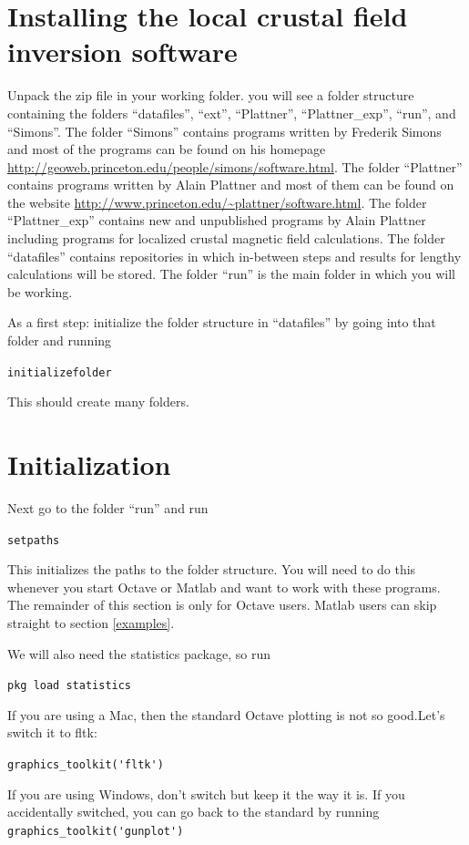 \documentclass[11pt]{article}
\begin{document}
\section{Installing the local crustal field inversion software}\label{installing}

Unpack the zip file in your working folder. you will see a folder structure containing the folders ``datafiles'', ``ext'', ``Plattner'', ``Plattner\_exp'', ``run'', and ``Simons''. The folder ``Simons'' contains programs written by Frederik Simons and most of the programs can be found on his homepage \url{http://geoweb.princeton.edu/people/simons/software.html}. The folder ``Plattner'' contains programs written by Alain Plattner and most of them can be found on the website \url{http://www.princeton.edu/~plattner/software.html}. The folder ``Plattner\_exp'' contains new and unpublished programs by Alain Plattner including programs for localized crustal magnetic field calculations. The folder ``datafiles'' contains repositories in which in-between steps and results for lengthy calculations will be stored. The folder ``run'' is the main folder in which you will be working.

As a first step: initialize the folder structure in ``datafiles'' by going into that folder and running

\qquad \verb+initializefolder+

This should create many folders.

\section{Initialization}

Next go to the folder ``run'' and run

\qquad \verb+setpaths+

This initializes the paths to the folder structure. You will need to do this whenever you start Octave or Matlab and want to work with these programs. The remainder of this section is only for Octave users. Matlab users can skip straight to section \ref{examples}.


We will also need the statistics package, so run 

\qquad \verb+pkg load statistics+

If you are using a Mac, then the standard Octave plotting is not so good.Let's switch it to fltk:

\qquad \verb+graphics_toolkit('fltk')+

If you are using Windows, don't switch but keep it the way it is. If you accidentally switched, you can go back to the standard by running \verb+graphics_toolkit('gunplot')+
\end{document}
